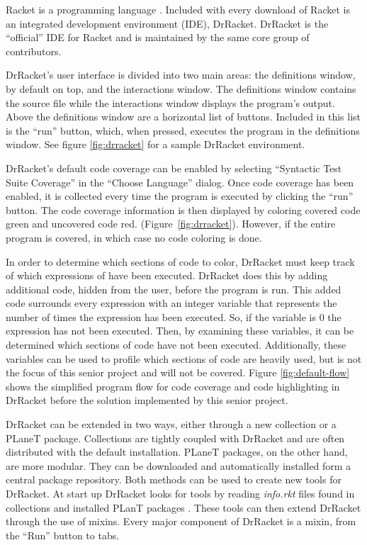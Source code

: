 Racket is a programming language \cite{racket}. Included with every download of Racket is an integrated development environment (IDE), DrRacket. DrRacket is the ``official'' IDE for Racket and is maintained by the same core group of contributors. 


DrRacket's user interface is divided into two main areas: the definitions window, by default on top, and the interactions window. The definitions window contains the source file while the interactions window displays the program's output. Above the definitions window are a horizontal list of buttons. Included in this list is the ``run'' button, which, when pressed, executes the program in the definitions window. See figure \ref{fig:drracket} for a sample DrRacket environment.

DrRacket's default code coverage can be enabled by selecting ``Syntactic Test Suite Coverage'' in the ``Choose Language'' dialog. Once code coverage has been enabled, it is collected every time the program is executed by clicking the ``run'' button. The code coverage information is then displayed by coloring covered code green and uncovered code red. (Figure~\ref{fig:drracket}). However, if the entire program is covered, in which case no code coloring is done.

In order to determine which sections of code to color, DrRacket must keep track of which expressions of have been executed. DrRacket does this by adding additional code, hidden from the user, before the program is run. This added code surrounds every expression with an integer variable that represents the number of times the expression has been executed. So, if the variable is 0 the expression has not been executed. Then, by examining these variables, it can be determined which sections of code have not been executed. Additionally, these variables can be used to profile which sections of code are heavily used, but is not the focus of this senior project and will not be covered. Figure \ref{fig:default-flow} shows the simplified program flow for code coverage and code highlighting in DrRacket before the solution implemented by this senior project.


DrRacket can be extended in two ways, either through a new collection or a PLaneT package. Collections are tightly coupled with DrRacket and are often distributed with the default installation. PLaneT packages, on the other hand, are more modular. They can be downloaded and automatically installed form a central package repository. Both methods can be used to create new tools for DrRacket. At start up DrRacket looks for tools by reading \emph{info.rkt} files found in collections and installed PLanT packages \cite{plugin}. These tools can then extend DrRacket through the use of mixins. Every major component of DrRacket is a mixin, from the ``Run'' button to tabs. 
